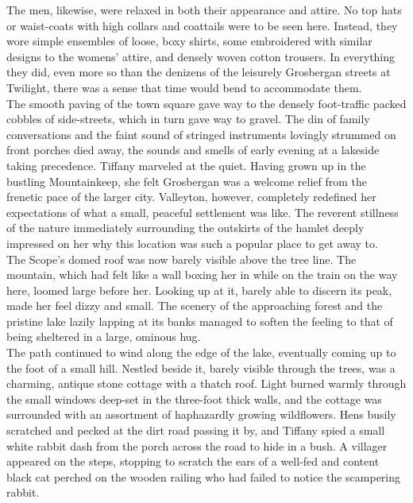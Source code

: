 The men, likewise, were relaxed in both their appearance and attire. 
No top hats or waist-coats with high collars and coattails were to be seen here.
Instead, they wore simple ensembles of loose, boxy shirts, some embroidered with similar designs to the womens' attire, and densely woven cotton trousers.
In everything they did, even more so than the denizens of the leisurely Grosbergan streets at Twilight, there was a sense that time would bend to accommodate them.\\

The smooth paving of the town square gave way to the densely foot-traffic packed cobbles of side-streets, which in turn gave way to gravel.
The din of family conversations and the faint sound of stringed instruments lovingly strummed on front porches died away, the sounds and smells of early evening at a lakeside taking precedence.
Tiffany marveled at the quiet. 
Having grown up in the bustling Mountainkeep, she felt Grosbergan was a welcome relief from the frenetic pace of the larger city.
Valleyton, however, completely redefined her expectations of what a small, peaceful settlement was like.
The reverent stillness of the nature immediately surrounding the outskirts of the hamlet deeply impressed on her why this location was such a popular place to get away to.\\

The Scope's domed roof was now barely visible above the tree line. 
The mountain, which had felt like a wall boxing her in while on the train on the way here, loomed large before her.
Looking up at it, barely able to discern its peak, made her feel dizzy and small. 
The scenery of the approaching forest and the pristine lake lazily lapping at its banks managed to soften the feeling to that of being sheltered in a large, ominous hug.\\

The path continued to wind along the edge of the lake, eventually coming up to the foot of a small hill.
Nestled beside it, barely visible through the trees, was a charming, antique stone cottage with a thatch roof.
Light burned warmly through the small windows deep-set in the three-foot thick walls, and the cottage was surrounded with an assortment of haphazardly growing wildflowers.
Hens busily scratched and pecked at the dirt road passing it by, and Tiffany spied a small white rabbit dash from the porch across the road to hide in a bush.
A villager appeared on the steps, stopping to scratch the ears of a well-fed and content black cat perched on the wooden railing who had failed to notice the scampering rabbit.\\

